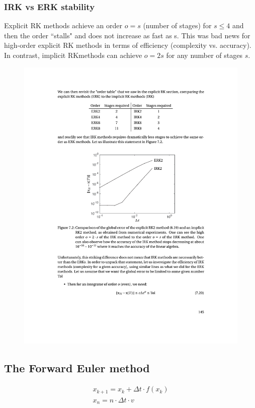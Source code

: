 \subsubsection{IRK vs ERK stability}
Explicit RK methods achieve an order $o = s$ (number of stages) for $s \leq 4$ and then the order “stalls" and does not increase as fast as s. This was bad news for high-order explicit RK methods in terms of efficiency (complexity vs. accuracy). In contrast, implicit RKmethods can achieve $o = 2s$ for any number of stages $s$.
\begin{figure}[h]
    \centering
    \includegraphics[width=\linewidth]{figures/RKStability_Table.pdf}
\end{figure}
\newpage
\subsection{The Forward Euler method}
\begin{subequations}
\begin{align}
    x_{k+1} = x_k + \Delta t \cdot f(x_k)\\
    x_n = n \cdot \Delta t \cdot v \label{eq:Euler}
\end{align}
\end{subequations}

